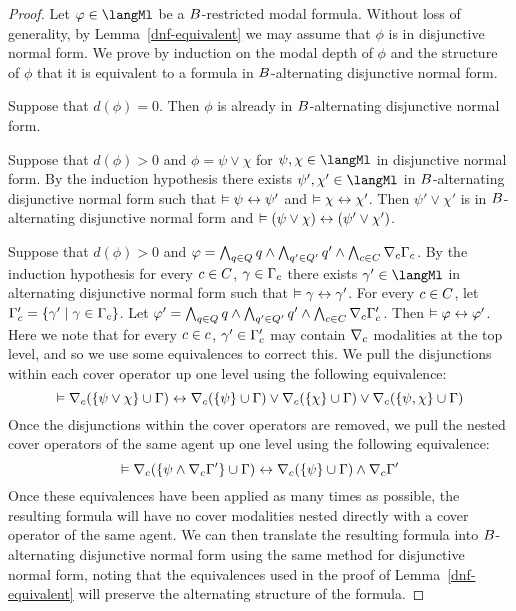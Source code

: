 \begin{proof}
Let $\phi \in \langMl$ be a $B$-restricted modal formula.
Without loss of generality, by Lemma~\ref{dnf-equivalent} we may assume that $\phi$ is in disjunctive normal form.
We prove by induction on the modal depth of $\phi$ and the structure of $\phi$ that it is equivalent to a formula in $B$-alternating disjunctive normal form.

Suppose that $d(\phi) = 0$. 
Then $\phi$ is already in $B$-alternating disjunctive normal form.

Suppose that $d(\phi) > 0$ and $\phi = \psi \lor \chi$ for $\psi, \chi \in \langMl$ in disjunctive normal form.
By the induction hypothesis there exists $\psi', \chi' \in \langMl$ in $B$-alternating disjunctive normal form such that $\vDash \psi \leftrightarrow \psi'$ and $\vDash \chi \leftrightarrow \chi'$.
Then $\psi' \lor \chi'$ is in $B$-alternating disjunctive normal form and $\vDash (\psi \lor \chi) \leftrightarrow (\psi' \lor \chi')$.

Suppose that $d(\phi) > 0$ and $\varphi = \bigwedge_{q \in Q} q \land \bigwedge_{q' \in Q'} q' \land \bigwedge_{c \in C} \nabla_{c} \Gamma_c$.
By the induction hypothesis for every $c \in C$, $\gamma \in \Gamma_c$ there exists $\gamma' \in \langMl$ in alternating disjunctive normal form such that $\vDash \gamma \leftrightarrow \gamma'$.
For every $c \in C$, let $\Gamma'_c = \{\gamma' \mid \gamma \in \Gamma_c\}$.
Let $\varphi' = \bigwedge_{q \in Q} q \land \bigwedge_{q' \in Q'} q' \land \bigwedge_{c \in C} \nabla_{c} \Gamma'_c$.
Then $\vDash \varphi \leftrightarrow \varphi'$.
Here we note that for every $c \in c$, $\gamma' \in \Gamma'_c$ may contain $\nabla_{c}$ modalities at the top level, and so we use some equivalences to correct this.
We pull the disjunctions within each cover operator up one level using the following equivalence:
$$
\vDash \nabla_{c} (\{\psi \lor \chi\} \cup \Gamma) \leftrightarrow \nabla_{c} (\{\psi\} \cup \Gamma) \lor \nabla_{c} (\{\chi\} \cup \Gamma) \lor \nabla_{c} (\{\psi, \chi\} \cup \Gamma)
$$
Once the disjunctions within the cover operators are removed, we pull the nested cover operators of the same agent up one level using the following equivalence:
$$
\vDash \nabla_{c} (\{\psi \land \nabla_{c} \Gamma'\} \cup \Gamma) \leftrightarrow \nabla_{c} (\{\psi\} \cup \Gamma) \land \nabla_{c} \Gamma'
$$
Once these equivalences have been applied as many times as possible, the resulting formula will have no cover modalities nested directly with a cover operator of the same agent.
We can then translate the resulting formula into $B$-alternating disjunctive normal form using the same method for disjunctive normal form, noting that the equivalences used in the proof of Lemma~\ref{dnf-equivalent} will preserve the alternating structure of the formula.
\end{proof}

